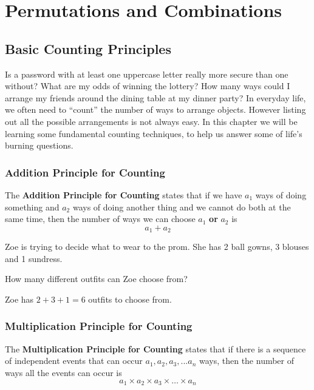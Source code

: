 \documentclass[11pt,a4paper]{book}
\begin{document}
\tableofcontents

\chapter{Permutations and Combinations}
\section{Basic Counting Principles}

Is a password with at least one uppercase letter really more secure
than one without? What are my odds of winning the lottery? How many
ways could I arrange my friends around the dining table at my dinner
party? In everyday life, we often need to \textquotedblleft count\textquotedblright{}
the number of ways to arrange objects. However listing out all the
possible arrangements is not always easy. In this chapter we will
be learning some fundamental counting techniques, to help us answer
some of life's burning questions. 

\subsection{Addition Principle for Counting}

\begin{tcolorbox}[colback=blue!5, colframe=black, boxrule=.4pt, sharpish corners]

The \textbf{Addition Principle for Counting} states that if we have
$a_{1}$ ways of doing something and $a_{2}$ ways of doing another
thing and we cannot do both at the same time, then the number of ways
we can choose $a_{1}$ \textbf{or} $a_{2}$ is 
\[
a_{1}+a_{2}
\]
\end{tcolorbox}

Zoe is trying to decide what to wear to the prom. She has 2 ball gowns,
3 blouses and 1 sundress. 

How many different outfits can Zoe choose from? 

Zoe has $2+3+1=6$ outfits to choose from.

\subsection{Multiplication Principle for Counting}

\begin{tcolorbox}[colback=blue!5, colframe=black, boxrule=.4pt, sharpish corners]

The \textbf{Multiplication Principle for Counting} states that if
there is a sequence of independent events that can occur $a_{1},a_{2},a_{3},...a_{n}$
ways, then the number of ways all the events can occur is 
\[
a_{1}\times a_{2}\times a_{3}\times\ldots\times a_{n}
\]
\end{tcolorbox}
\end{document}
